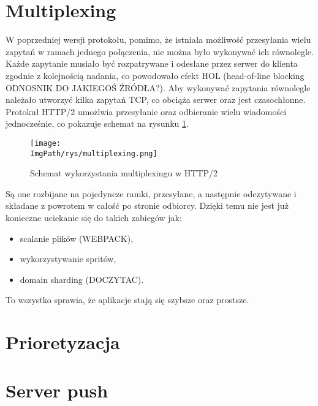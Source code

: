 \documentclass[a4paper,12pt,twoside,openany]{report}
\newcommand{\ImgPath}{.}
\begin{document}
\section{Multiplexing}
\label{sectionMultiplexing}
W poprzedniej wersji protokołu, pomimo, że istniała możliwość przesyłania wielu zapytań w ramach jednego połączenia, nie można było wykonywać ich równolegle.
Każde zapytanie musiało być rozpatrywane i odesłane przez serwer do klienta zgodnie z kolejnością nadania, co powodowało efekt HOL (head-of-line blocking ODNOSNIK  DO JAKIEGOŚ ŹRÓDŁA?).
Aby wykonywać zapytania równolegle należało utworzyć kilka zapytań TCP, co obciąża serwer oraz jest czasochłonne.
Protokuł HTTP/2 umożlwia przesyłanie oraz odbieranie wielu wiadomości jednocześnie, co pokazuje schemat na rysunku \ref{schematMultiplexing}.
\begin{figure}[!htbp]
	\begin{center}
\centering
\texttt{[image: \\ImgPath/rys/multiplexing.png]}
\end{center}
	\caption{Schemat wykorzystania multiplexingu w HTTP/2}
	\label{schematMultiplexing}
\end{figure}
Są one rozbijane na pojedyncze ramki, przesyłane, a następnie odczytywane i składane z powrotem w całość po stronie odbiorcy.
Dzięki temu nie jest już konieczne uciekanie się do takich zabiegów jak:
\begin{itemize}
	\item scalanie plików (WEBPACK),
	\item  wykorzystywanie spritów,
	\item domain sharding (DOCZYTAC).
\end{itemize}
To wszystko sprawia, że aplikacje stają się szybsze oraz prostsze.

\section{Prioretyzacja}


\section{Server push}
\label{sectionServerPush}
\end{document}
